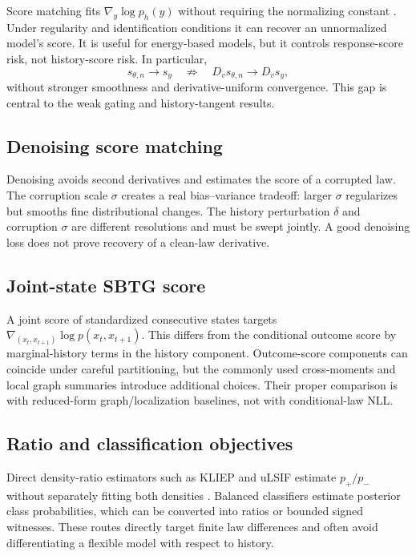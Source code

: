 \documentclass[10pt]{article}
\begin{document}
Score matching fits \(\nabla_y\log p_h(y)\) without requiring the normalizing constant \cite{hyvarinen2005}. Under regularity and identification conditions it can recover an unnormalized model's score. It is useful for energy-based models, but it controls response-score risk, not history-score risk. In particular,
\[
  s_{\theta,n}\to s_y
  \quad\not\Rightarrow\quad
  D_v s_{\theta,n}\to D_v s_y,
\]
without stronger smoothness and derivative-uniform convergence. This gap is central to the weak gating and history-tangent results.

\subsection{Denoising score matching}

Denoising avoids second derivatives and estimates the score of a corrupted law. The corruption scale \(\sigma\) creates a real bias--variance tradeoff: larger \(\sigma\) regularizes but smooths fine distributional changes. The history perturbation \(\delta\) and corruption \(\sigma\) are different resolutions and must be swept jointly. A good denoising loss does not prove recovery of a clean-law derivative.

\subsection{Joint-state SBTG score}

A joint score of standardized consecutive states targets \(\nabla_{(x_t,x_{t+1})}\log p(x_t,x_{t+1})\). This differs from the conditional outcome score by marginal-history terms in the history component. Outcome-score components can coincide under careful partitioning, but the commonly used cross-moments and local graph summaries introduce additional choices. Their proper comparison is with reduced-form graph/localization baselines, not with conditional-law NLL.

\subsection{Ratio and classification objectives}

Direct density-ratio estimators such as KLIEP and uLSIF estimate \(p_+/p_-\) without separately fitting both densities \cite{kanamori2009}. Balanced classifiers estimate posterior class probabilities, which can be converted into ratios or bounded signed witnesses. These routes directly target finite law differences and often avoid differentiating a flexible model with respect to history.
\end{document}
